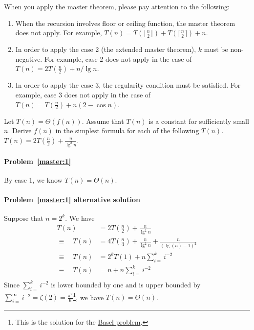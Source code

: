 \begin{remark} When you apply the master theorem, please pay attention to the following:
\begin{enumerate}
\item When the recursion involves floor or ceiling function, the master theorem does not apply. For example, $T(n) = T(\lfloor \frac{n}{2} \rfloor) + T(\lceil \frac{n}{2} \rceil) + n$. 
\item In order to apply the case 2 (the extended master theorem), $k$ must be non-negative. For example, case 2 does not apply in the case of $T(n) = 2T(\frac{n}{2}) + n/ \lg n$.
\item In order to apply the case 3, the regularity condition must be satisfied. For example, case 3 does not apply in the case of $T(n) = T(\frac{n}{2}) + n(2 - \cos n)$.
\end{enumerate}
\end{remark}

\begin{Exercise}[origin={NCTU CSIE 104}]
Let $T(n) = \Theta(f(n))$. Assume that $T(n)$ is a constant for sufficiently small $n$. Derive $f(n)$ in the simplest formula for each of the following $T(n)$.
\Question $T(n) = 2T(\frac{n}{2}) + \frac{n}{\lg^2 n}$. \label{master:1}
\end{Exercise}
\begin{Answer}

\paragraph{Problem~\ref{master:1}} By case 1, we know $T(n) = \Theta(n)$.

\paragraph{Problem~\ref{master:1} alternative solution} Suppose that $n = 2^k$. We have
\begin{align*}
T(n) &= 2T(\frac{n}{2}) + \frac{n}{\lg^2 n} \\
\equiv \quad T(n) &= 4T(\frac{n}{4}) + \frac{n}{\lg^2 n} + \frac{n}{(\lg (n)-1)^2} \\
\equiv \quad T(n) &= 2^k T(1) + n \sum_{i=}^k i^{-2} \\
\equiv \quad T(n) &= n + n \sum_{i=}^k i^{-2} \\
\end{align*}
Since $\sum_{i=}^k i^{-2}$ is lower bounded by one and is upper bounded by $\sum_{i=}^{\infty} i^{-2} = \zeta(2) = \frac{\pi^2}{6}$\footnote{This is the solution for the \href{https://en.wikipedia.org/wiki/Basel_problem}{Basel problem}.}, we have $T(n) = \Theta(n)$.
\end{Answer}

